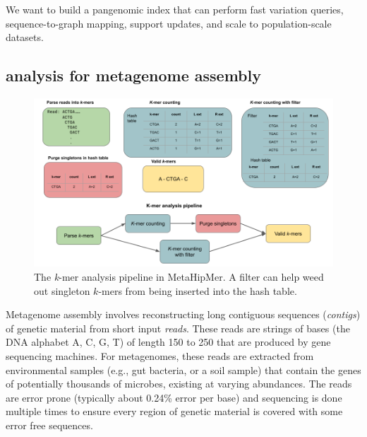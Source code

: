 \begin{rproblem}
 We want to build a pangenomic index that can perform fast variation queries, sequence-to-graph mapping, support updates, and scale to population-scale datasets.
\label{rprob:peppermint3}
\end{rproblem}

\subsection{\kmer analysis for metagenome assembly}


\begin{figure}
    \centering
    \includegraphics[width=0.9\linewidth]{images/mhm-pipeline.png}
    \caption{The \textit{k}-mer analysis pipeline in MetaHipMer. A filter can help weed out singleton $k$-mers from being inserted into the hash table.}
    \vspace{-0.5em}
    \label{fig:mhm-kmer}
\end{figure}

Metagenome assembly involves reconstructing long contiguous sequences ({\it contigs}) of genetic material from short input {\it reads}. These reads are strings of bases (the DNA alphabet A, C, G, T) of length 150 to 250 that are produced by gene sequencing machines.  For metagenomes, these reads are extracted from environmental samples (e.g., gut bacteria, or a soil sample) that contain the genes of potentially thousands of microbes, existing at varying abundances.  The reads are error prone (typically about 0.24\% error per base) and sequencing is done multiple times to ensure every region of genetic material is covered with some error free sequences.


